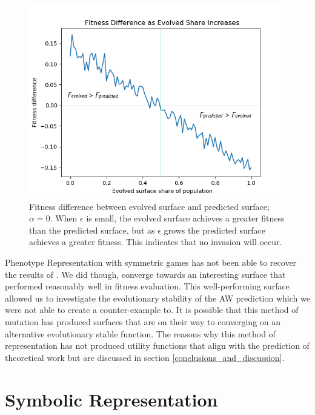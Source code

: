 \documentclass[11pt]{book}
\newcommand*{\np}{\par\noindent\newline}
\begin{document}
\begin{figure}
	\centering
	\includegraphics[scale=0.7]{resources/linegraph_fitness_difference_increasing_epsilon.png}
	\caption{Fitness difference between evolved surface and predicted surface; $\alpha = 0$.
	When $\epsilon$ is small, the evolved surface achieves a greater fitness than the predicted surface, but as $\epsilon$ grows the predicted surface achieves a greater fitness.
	This indicates that no invasion will occur.}
	\label{linegraph_fitness_difference_increasing_epsilon}
\end{figure}
\np Phenotype Representation with symmetric games has not been able to recover the results of \citet{alger_generalization_2012}.
We did though, converge towards an interesting surface that performed reasonably well in fitness evaluation.
This well-performing surface allowed us to investigate the evolutionary stability of the AW prediction which we were not able to create a counter-example to. 
It is possible that this method of mutation has produced surfaces that are on their way to converging on an alternative evolutionary stable function.
The reasons why this method of representation has not produced utility functions that align with the prediction of theoretical work but are discussed in section \ref{conclusions_and_discussion}.


\section{Symbolic Representation}\label{symmetricGames_symb}
\end{document}
